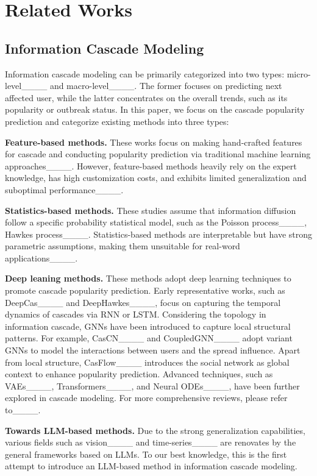 \section{Related Works}
\subsection{Information Cascade Modeling}
    Information cascade modeling can be primarily categorized into two types: micro-level____ and macro-level____.
    The former focuses on predicting next affected user, while the latter concentrates on the overall trends, such as its popularity or outbreak status.
    In this paper, we focus on the cascade popularity prediction and categorize existing methods into three types:
    
    \noindent \textbf{Feature-based methods.}
    These works focus on making hand-crafted features for cascade and conducting popularity prediction via traditional machine learning approaches____.
    However, feature-based methods heavily rely on the expert knowledge, has high customization costs, and exhibits limited generalization and suboptimal performance____. 

    \noindent \textbf{Statistics-based methods.}
    These studies assume that information diffusion follow a specific probability statistical model, such as the Poisson process____, Hawkes process____. 
    Statistics-based methods are interpretable but have strong parametric assumptions, making them unsuitable for real-word applications____.
    
    \noindent \textbf{Deep leaning methods.}
    These methods adopt deep learning techniques to promote cascade popularity prediction.
    Early representative works, such as DeepCas____ and DeepHawkes____, focus on capturing the temporal dynamics of cascades via RNN or LSTM.
    Considering the topology in information cascade, GNNs have been introduced to capture local structural patterns. 
    For example, CasCN____ and CoupledGNN____ adopt variant GNNs to model the interactions between users and the spread influence.
    Apart from local structure, CasFlow____ introduces the social network as global context to enhance popularity prediction.
    Advanced techniques, such as VAEs____, Transformers____, and Neural ODEs____, have been further explored in cascade modeling.
    For more comprehensive reviews, please refer to____.

    \noindent \textbf{Towards LLM-based methods.}
    Due to the strong generalization capabilities, various fields such as vision____ and time-series____ are renovates by the general frameworks based on LLMs. 
    To our best knowledge, this is the first attempt to introduce an LLM-based method in information cascade modeling.

